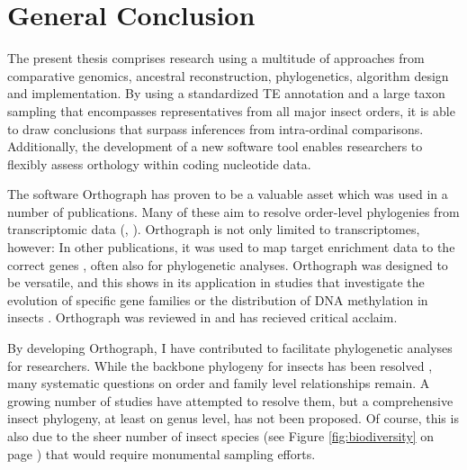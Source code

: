 \chapter{General Conclusion}
\label{conclusion}

The present thesis comprises research using a multitude of approaches
from comparative genomics, ancestral reconstruction, phylogenetics,
algorithm design and implementation. By using a standardized TE
annotation and a large taxon sampling that encompasses representatives
from all major insect orders, it is able to draw conclusions that
surpass inferences from intra-ordinal comparisons.  Additionally, the
development of a new software tool enables researchers to flexibly
assess orthology within coding nucleotide data.

The software Orthograph has proven to be a valuable asset which was used
in a number of publications. Many of these aim to resolve order-level
phylogenies from transcriptomic data (\eg, \citet{Peters2017, Bank2017,
Kutty2018, Simon2018, Gillung2018, Johnson2018}). Orthograph is not only
limited to transcriptomes, however: In other publications, it was used
to map target enrichment data to the correct genes \citep{Mayer2016,
Shin2017, Sann2018}, often also for phylogenetic analyses. Orthograph
was designed to be versatile, and this shows in its application in
studies that investigate the evolution of specific gene families
\citep{Pauli2016, Dowling2017} or the distribution of DNA methylation in
insects \citep{Provataris2018}. Orthograph was reviewed in
\citet{Nichio2017} and has recieved critical acclaim.

By developing Orthograph, I have contributed to facilitate phylogenetic
analyses for researchers. While the backbone phylogeny for insects has
been resolved \citep{Misof12014}, many systematic questions on order and
family level relationships remain. A growing number of studies have
attempted to resolve them, but a comprehensive insect phylogeny, at
least on genus level, has not been proposed. Of course, this is also due
to the sheer number of insect species (see Figure \ref{fig:biodiversity}
on page \pageref{fig:biodiversity}) that would require monumental
sampling efforts.

